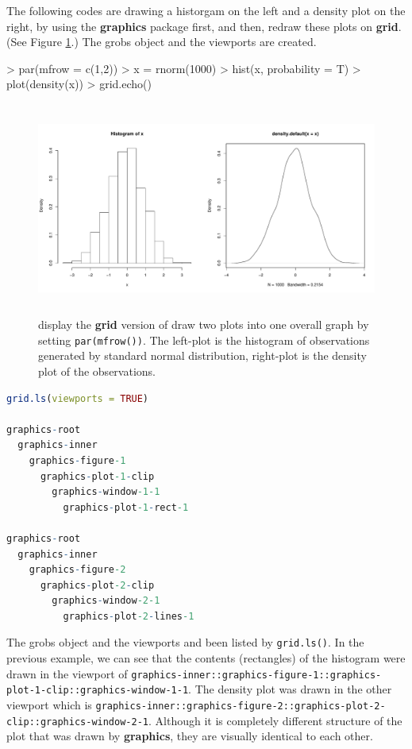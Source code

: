 \documentclass[11pt,twoside]{report}
\begin{document}
The following codes are drawing a historgam on the left and a density plot on the right, by using the \textbf{graphics} package first, and then, redraw these plots on \textbf{grid}. (See Figure \ref{figure_4.1}.) The grobs object and the viewports are created.
\begin{Schunk}
\begin{Sinput}
> par(mfrow = c(1,2))
> x = rnorm(1000)
> hist(x, probability = T)
> plot(density(x))
> grid.echo()
\end{Sinput}
\end{Schunk}
\begin{figure}[!h]
	\begin{center}
		\includegraphics[height = 7cm, width = 14cm]{figure/viewport_demo_1.pdf}
		\caption{display the \textbf{grid} version of draw two plots into one overall graph by setting \texttt{par(mfrow())}. The left-plot is the histogram of observations generated by standard normal distribution, right-plot is the density plot of the observations.}
		\label{figure_4.1}
	\end{center}
\end{figure}

\newpage
\begin{lstlisting}[language = R]
grid.ls(viewports = TRUE)

graphics-root
  graphics-inner
    graphics-figure-1
      graphics-plot-1-clip
        graphics-window-1-1
          graphics-plot-1-rect-1

graphics-root
  graphics-inner
    graphics-figure-2
      graphics-plot-2-clip
        graphics-window-2-1
          graphics-plot-2-lines-1


\end{lstlisting}


The grobs object and the viewports and been listed by \texttt{grid.ls()}. In the previous example, we can see that the contents (rectangles) of the histogram were drawn in the viewport of \texttt{graphics-inner::graphics-figure-1::graphics-plot-1-clip::graphics-window-1-1}. The density plot was drawn in the other viewport which is \texttt{graphics-inner::graphics-figure-2::graphics-plot-2-clip::graphics-window-2-1}. Although it is completely different structure of the plot that was drawn by \textbf{graphics}, they are visually identical to each other.\\
\end{document}
